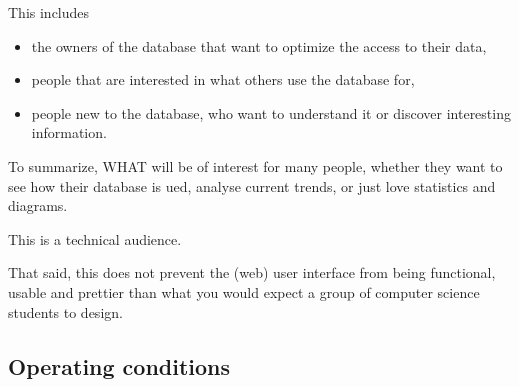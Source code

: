 This includes
\begin{itemize}
  \item the owners of the database that want to optimize the access to
  	their data,
  	
  \item people that are interested in what others use the database for,

  
  \item people new to the database, who want to understand it or discover interesting information.

\end{itemize}
To summarize, WHAT will be of interest for many people, 
whether they want to see how their database is ued, analyse current trends,
or just love statistics and diagrams.

%   
%   




This is a technical audience.
 
That said, this does not prevent the (web) user interface from being functional,
usable and prettier than what you would expect a group of 
computer science students to design.
 

\subsection{Operating conditions}


